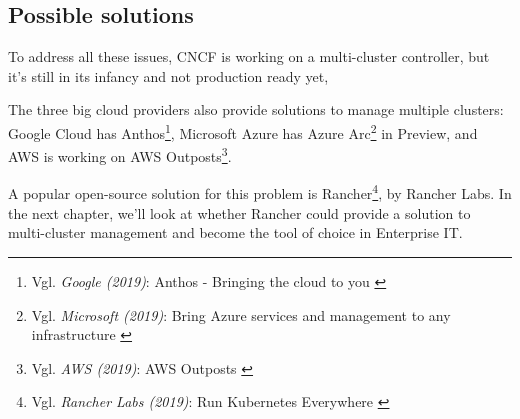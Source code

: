 \subsection{Possible solutions}

To address all these issues, CNCF is working on a multi-cluster controller, but it's still in its infancy and not production ready yet,

The three big cloud providers also provide solutions to manage multiple clusters: Google Cloud has Anthos\footnote{Vgl. \textit{Google (2019)}: Anthos - Bringing the cloud to you \cite{googleAnthos}}, Microsoft Azure has Azure Arc\footnote{Vgl. \textit{Microsoft (2019)}: Bring Azure services and management to any infrastructure \cite{azureArc}} in Preview, and AWS is working on AWS Outposts\footnote{Vgl. \textit{AWS (2019)}: AWS Outposts \cite{awsOutposts}}.

A popular open-source solution for this problem is Rancher\footnote{Vgl. \textit{Rancher Labs (2019)}: Run Kubernetes Everywhere \cite{rancher}}, by Rancher Labs. In the next chapter, we'll look at whether Rancher could provide a solution to multi-cluster management and become the tool of choice in Enterprise IT.

